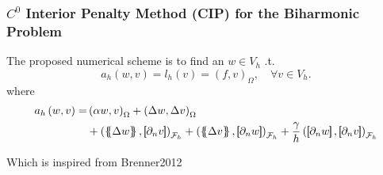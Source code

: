 \begin{frame}
\frametitle{ $C^0$ Interior Penalty Method (CIP) for the Biharmonic Problem }

\begin{block}{}
The proposed numerical scheme is to find an  $w \in V_{h}$ .t.
\begin{equation*}
\label{eq:CP_A_F}
a_{h}( w, v )   = l_{h}( v) = ( f,v)_{\Omega } , \quad \forall v \in V_{h}  .
\end{equation*}
where
\begin{equation*}
\begin{split}
a_{h} \left( w, v \right)   =&
    \left( \alpha  w, v \right) _{\Omega }   +  \left( \Delta  w, \Delta v \right) _{\Omega } \\
 & +
  \left( \mean{  \Delta  w }, \jump{ \partial _{n }v} \right)_{\mathcal{F}_{h}}  +
 \left( \mean{ \Delta  v }, \jump{ \partial _{n}w }      \right)_{\mathcal{F}_{h}}  + \frac{\gamma }{h}  \left( \jump{ \partial _{n} w}, \jump{ \partial _{n} v   }   \right)_{\mathcal{F}_{h}}
\end{split}
\end{equation*}

Which is inspired from Brenner2012 \footnotemark[1]
\end{block}


\end{frame}


